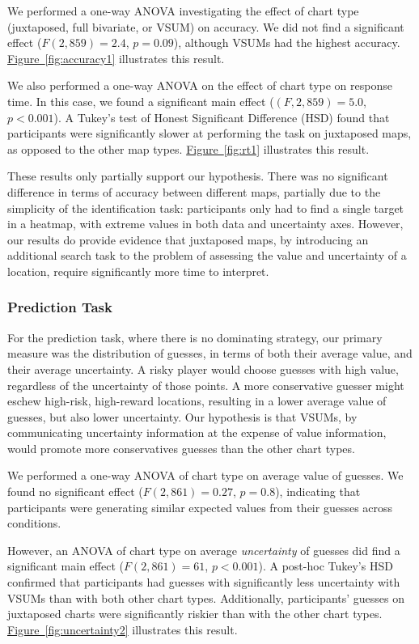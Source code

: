 \documentclass{vgtc}                          %
\newcommand{\figref}[1]{\hyperref[#1]{Figure~\ref*{#1}}}
\begin{document}
We performed a one-way ANOVA investigating the effect of chart type (juxtaposed, full bivariate, or VSUM) on accuracy. We did not find a significant effect ($F(2,859) = 2.4$, $p=0.09$), although VSUMs had the highest accuracy. \figref{fig:accuracy1} illustrates this result.

We also performed a one-way ANOVA on the effect of chart type on response time. In this case, we found a significant main effect ($(F,2,859) = 5.0$, $p<0.001$). A Tukey's test of Honest Significant Difference (HSD) found that participants were significantly slower at performing the task on juxtaposed maps, as opposed to the other map types. \figref{fig:rt1} illustrates this result.

These results only partially support our hypothesis. There was no significant difference in terms of accuracy between different maps, partially due to the simplicity of the identification task: participants only had to find a single target in a heatmap, with extreme values in both data and uncertainty axes. However, our results do provide evidence that juxtaposed maps, by introducing an additional search task to the problem of assessing the value and uncertainty of a location, require significantly more time to interpret.

\subsubsection{Prediction Task}

\uncertaintyFig

For the prediction task, where there is no dominating strategy, our primary measure was the distribution of guesses, in terms of both their average value, and their average uncertainty. A risky player would choose guesses with high value, regardless of the uncertainty of those points. A more conservative guesser might eschew high-risk, high-reward locations, resulting in a lower average value of guesses, but also lower uncertainty. Our hypothesis is that VSUMs, by communicating uncertainty information at the expense of value information, would promote more conservatives guesses than the other chart types.

We performed a one-way ANOVA of chart type on average value of guesses. We found no significant effect ($F(2,861)=0.27$, $p=0.8$), indicating that participants were generating similar expected values from their guesses across conditions.

However, an ANOVA of chart type on average \emph{uncertainty} of guesses did find a significant main effect ($F(2,861)=61$, $p<0.001$). A post-hoc Tukey's HSD confirmed that participants had guesses with significantly less uncertainty with VSUMs than with both other chart types. Additionally, participants' guesses on juxtaposed charts were significantly riskier than with the other chart types. \figref{fig:uncertainty2} illustrates this result.
\end{document}
